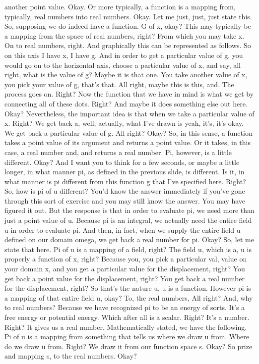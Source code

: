 \documentclass[10pt]{article}
\begin{document}
{another point value. Okay. Or more typically, a function is a mapping from, typically, real numbers into real numbers. Okay. Let me just, just, just state this. So, supposing we do indeed have a function. G of x, okay? This may typically be a mapping from the space of real numbers, right? From which you may take x. On to real numbers, right. And graphically this can be represented as follows. So on this axis I have x, I have g. And in order to get a particular value of g, you would go on to the horizontal axis, choose a particular value of x, and say, all right, what is the value of g? Maybe it is that one. You take another value of x, you pick your value of g, that's that. All right, maybe this is this, and. The process goes on. Right? Now the function that we have in mind is what we get by connecting all of these dots. Right? And maybe it does something else out here. Okay? Nevertheless, the important idea is that when we take a particular value of x. Right? We get back a, well, actually, what I've drawn is yeah, it's, it's okay. We get back a particular value of g. All right? Okay? So, in this sense, a function takes a point value of its argument and returns a point value. Or it takes, in this case, a real number and, and returns a real number. Pi, however, is a little different. Okay? And I want you to think for a few seconds, or maybe a little longer, in what manner pi, as defined in the previous slide, is different. Is it, in what manner is pi different from this function g that I've specified here. Right? So, how is pi of u different? You'd know the answer immediately if you've gone through this sort of exercise and you may still know the answer. You may have figured it out. But the response is that in order to evaluate pi, we need more than just a point value of u. Because pi is an integral, we actually need the entire field u in order to evaluate pi. And then, in fact, when we supply the entire field u defined on our domain omega, we get back a real number for pi. Okay? So, let me state that here. Pi of u is a mapping of a field, right? The field u, which is a, u is properly a function of x, right? Because you, you pick a particular val, value on your domain x, and you get a particular value for the displacement, right? You get back a point value for the displacement, right? You get back a real number for the displacement, right? So that's the nature u, u is a function. However pi is a mapping of that entire field u, okay? To, the real numbers, All right? And, why to real numbers? Because we have recognized pi to be an energy of sorts. It's a free energy or potential energy. Which after all is a scalar. Right? It's a number. Right? It gives us a real number. Mathematically stated, we have the following. Pi of u is a mapping from something that tells us where we draw u from. Where do we draw u from. Right? We draw it from our function space s. Okay? So prize and mapping s, to the real numbers. Okay?

}
\end{document}
